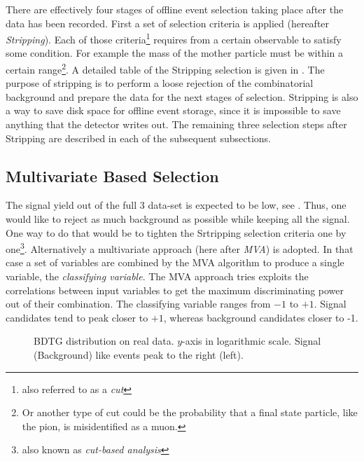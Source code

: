
There are effectively four stages of offline event selection taking place after the data has been recorded.
First a set of selection criteria is applied (hereafter {\it Stripping}). Each of those criteria\footnote{also referred to as a {\it cut}}
requires from a certain observable to satisfy some condition. For example the mass of the mother particle \Bs must be within
a certain range\footnote{Or another type of cut could be the probability that a final state particle, like the pion, is misidentified
as a muon.}.  A detailed table of the Stripping selection is given in . The purpose of stripping is to perform
a loose rejection of the combinatorial background and prepare the data for the next stages of selection. Stripping is also a way to save
disk space for offline event storage, since it is impossible to save anything that the detector writes out. The remaining three selection
steps after Stripping are described in each of the subsequent subsections.

\subsection{Multivariate Based Selection}
\label{Multivariate_Based_Selection}

The \BsJpsiKst signal yield out of the full 3 \invfb data-set is expected to be low, see . Thus, one would like to
reject as much background as possible while keeping all the signal. One way to do that would be to tighten the Srtripping selection criteria
one by one\footnote{also known as {\it cut-based analysis}}. Alternatively a multivariate approach (here after {\it MVA}) is adopted.
In that case a set of variables are combined by the MVA algorithm to produce a single variable, the {\it classifying variable}.
The MVA approach tries exploits the correlations between input variables to get the maximum discriminating power out of their combination.
The classifying variable ranges from $-1$ to $+1$. Signal candidates tend to peak closer to $+1$, whereas background candidates closer to -1.

\begin{figure}[h]
\begin{center}
  \scalebox{1}{}
  \caption{BDTG distribution on real data. $y$-axis in logarithmic scale. Signal (Background) like events peak to the right (left). }
  \label{BTDG_performance}
\end{center}
\end{figure}

